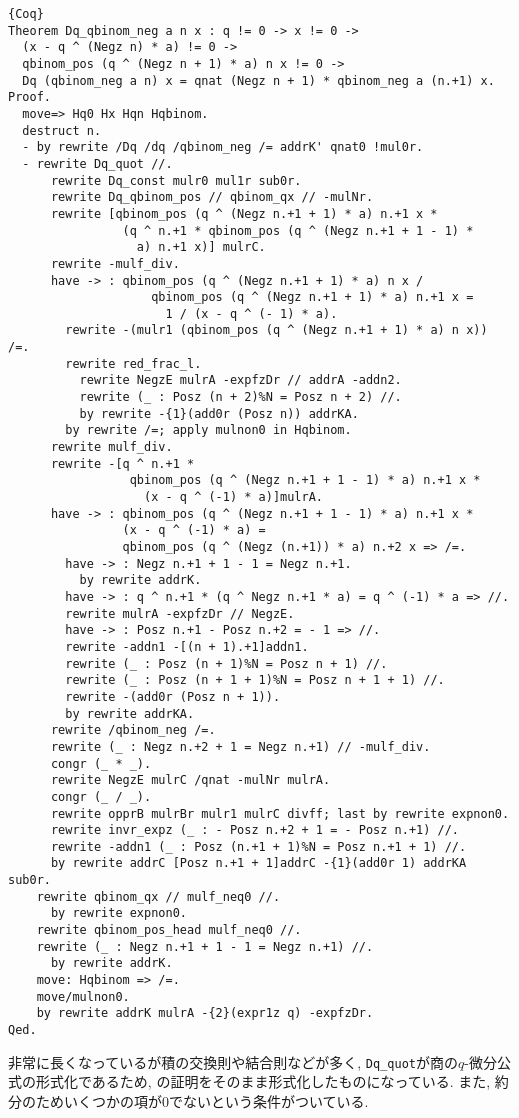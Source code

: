 \documentclass[11pt]{jsreport}
\theoremstyle{mystyle}
\newcommand{\0}{\textbf{0}}
\begin{document}
\begin{lstlisting}{Coq}
Theorem Dq_qbinom_neg a n x : q != 0 -> x != 0 ->
  (x - q ^ (Negz n) * a) != 0 ->
  qbinom_pos (q ^ (Negz n + 1) * a) n x != 0 ->
  Dq (qbinom_neg a n) x = qnat (Negz n + 1) * qbinom_neg a (n.+1) x.
Proof.
  move=> Hq0 Hx Hqn Hqbinom.
  destruct n.
  - by rewrite /Dq /dq /qbinom_neg /= addrK' qnat0 !mul0r.
  - rewrite Dq_quot //.
      rewrite Dq_const mulr0 mul1r sub0r.
      rewrite Dq_qbinom_pos // qbinom_qx // -mulNr.
      rewrite [qbinom_pos (q ^ (Negz n.+1 + 1) * a) n.+1 x *
                (q ^ n.+1 * qbinom_pos (q ^ (Negz n.+1 + 1 - 1) *
                  a) n.+1 x)] mulrC.
      rewrite -mulf_div.
      have -> : qbinom_pos (q ^ (Negz n.+1 + 1) * a) n x /
                    qbinom_pos (q ^ (Negz n.+1 + 1) * a) n.+1 x =
                      1 / (x - q ^ (- 1) * a).
        rewrite -(mulr1 (qbinom_pos (q ^ (Negz n.+1 + 1) * a) n x)) /=.
        rewrite red_frac_l.
          rewrite NegzE mulrA -expfzDr // addrA -addn2.
          rewrite (_ : Posz (n + 2)%N = Posz n + 2) //.
          by rewrite -{1}(add0r (Posz n)) addrKA.
        by rewrite /=; apply mulnon0 in Hqbinom.
      rewrite mulf_div.
      rewrite -[q ^ n.+1 *
                 qbinom_pos (q ^ (Negz n.+1 + 1 - 1) * a) n.+1 x *
                   (x - q ^ (-1) * a)]mulrA.
      have -> : qbinom_pos (q ^ (Negz n.+1 + 1 - 1) * a) n.+1 x *
                (x - q ^ (-1) * a) =
                qbinom_pos (q ^ (Negz (n.+1)) * a) n.+2 x => /=.
        have -> : Negz n.+1 + 1 - 1 = Negz n.+1.
          by rewrite addrK.
        have -> : q ^ n.+1 * (q ^ Negz n.+1 * a) = q ^ (-1) * a => //.
        rewrite mulrA -expfzDr // NegzE.
        have -> : Posz n.+1 - Posz n.+2 = - 1 => //.
        rewrite -addn1 -[(n + 1).+1]addn1.
        rewrite (_ : Posz (n + 1)%N = Posz n + 1) //.
        rewrite (_ : Posz (n + 1 + 1)%N = Posz n + 1 + 1) //.
        rewrite -(add0r (Posz n + 1)).
        by rewrite addrKA.
      rewrite /qbinom_neg /=.
      rewrite (_ : Negz n.+2 + 1 = Negz n.+1) // -mulf_div.
      congr (_ * _).
      rewrite NegzE mulrC /qnat -mulNr mulrA.
      congr (_ / _).
      rewrite opprB mulrBr mulr1 mulrC divff; last by rewrite expnon0.
      rewrite invr_expz (_ : - Posz n.+2 + 1 = - Posz n.+1) //.
      rewrite -addn1 (_ : Posz (n.+1 + 1)%N = Posz n.+1 + 1) //.
      by rewrite addrC [Posz n.+1 + 1]addrC -{1}(add0r 1) addrKA sub0r.
    rewrite qbinom_qx // mulf_neq0 //.
      by rewrite expnon0.
    rewrite qbinom_pos_head mulf_neq0 //.
    rewrite (_ : Negz n.+1 + 1 - 1 = Negz n.+1) //.
      by rewrite addrK.
    move: Hqbinom => /=.
    move/mulnon0.
    by rewrite addrK mulrA -{2}(expr1z q) -expfzDr.
Qed.\end{lstlisting}
非常に長くなっているが積の交換則や結合則などが多く, {\tt Dq\_quot}が商の$q$-微分公式の形式化であるため, \cite{Kac}の証明をそのまま形式化したものになっている. また, 約分のためいくつかの項が$0$でないという条件がついている. 
\end{document}
